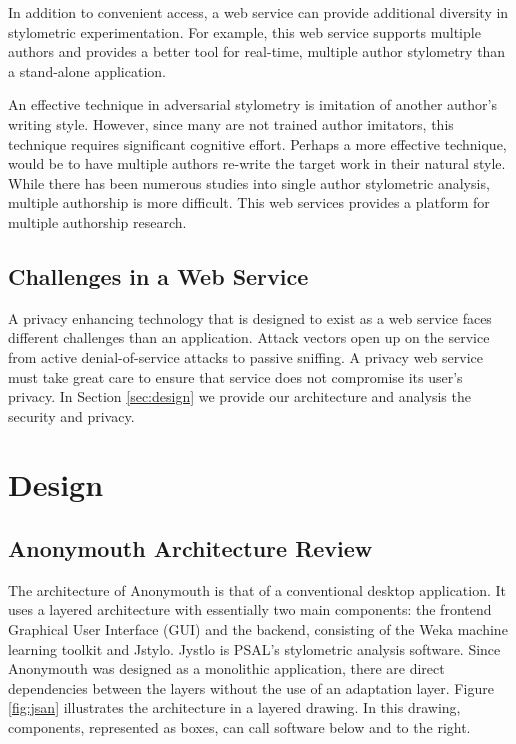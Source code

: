\documentclass[letterpaper]{article}
\begin{document}
In addition to convenient access, a web service can provide additional
diversity in stylometric experimentation.  For example, this web
service supports multiple authors and provides a better tool for
real-time, multiple author stylometry than a stand-alone application.

An effective technique in adversarial stylometry is imitation of
another author's writing style.  However, since many are not trained
author imitators, this technique requires significant cognitive effort.
Perhaps a more effective technique, would be to have multiple authors
re-write the target work in their natural style.  While there has been
numerous studies into single author stylometric analysis, multiple
authorship is more difficult.  This web services provides a platform
for multiple authorship research.

\subsection{Challenges in a Web Service}

A privacy enhancing technology that is designed to exist as a web
service faces different challenges than an application.  Attack
vectors open up on the service from active denial-of-service attacks
to passive sniffing.  A privacy web service must take great care to
ensure that service does not compromise its user's privacy.  In
Section \ref{sec:design} we provide our architecture and analysis the
security and privacy.


\section{Design}

\subsection{Anonymouth Architecture Review}

The architecture of Anonymouth is that of a conventional desktop
application.  It uses a layered architecture with essentially two main
components: the frontend Graphical User Interface (GUI) and the
backend, consisting of the Weka machine learning toolkit and Jstylo.
Jystlo is PSAL's stylometric analysis software.   Since Anonymouth was
designed as a monolithic application, there are direct dependencies
between the layers without the use of an adaptation layer.  Figure
\ref{fig:jsan} illustrates the architecture in a layered drawing.  In
this drawing, components, represented as boxes, can call software
below and to the right.
\end{document}
